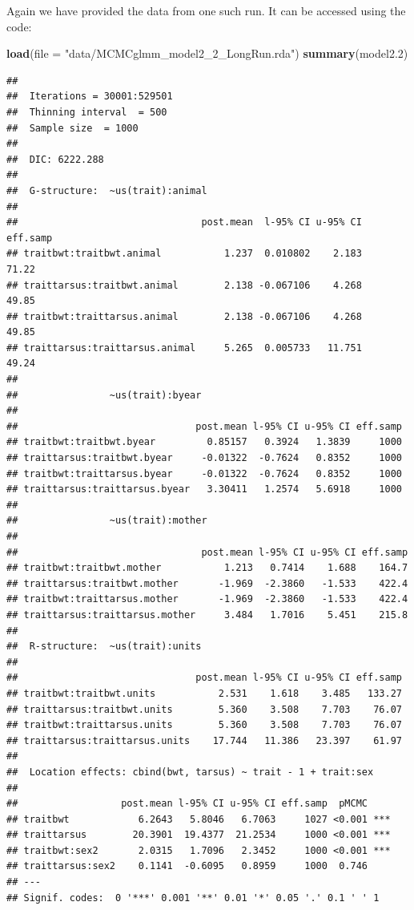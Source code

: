\documentclass[
  12pt,
]{book}
\newenvironment{Shaded}{\begin{snugshade}}{\end{snugshade}}
\newcommand{\DataTypeTok}[1]{\textcolor[rgb]{0.13,0.29,0.53}{#1}}
\newcommand{\FloatTok}[1]{\textcolor[rgb]{0.00,0.00,0.81}{#1}}
\newcommand{\KeywordTok}[1]{\textcolor[rgb]{0.13,0.29,0.53}{\textbf{#1}}}
\newcommand{\NormalTok}[1]{#1}
\newcommand{\StringTok}[1]{\textcolor[rgb]{0.31,0.60,0.02}{#1}}
\begin{document}
Again we have provided the data from one such run. It can be accessed using the code:

\begin{Shaded}
\begin{Highlighting}[]
\KeywordTok{load}\NormalTok{(}\DataTypeTok{file =} \StringTok{"data/MCMCglmm\_model2\_2\_LongRun.rda"}\NormalTok{)}
\KeywordTok{summary}\NormalTok{(model2}\FloatTok{.2}\NormalTok{)}
\end{Highlighting}
\end{Shaded}

\begin{verbatim}
## 
##  Iterations = 30001:529501
##  Thinning interval  = 500
##  Sample size  = 1000 
## 
##  DIC: 6222.288 
## 
##  G-structure:  ~us(trait):animal
## 
##                                post.mean  l-95% CI u-95% CI eff.samp
## traitbwt:traitbwt.animal           1.237  0.010802    2.183    71.22
## traittarsus:traitbwt.animal        2.138 -0.067106    4.268    49.85
## traitbwt:traittarsus.animal        2.138 -0.067106    4.268    49.85
## traittarsus:traittarsus.animal     5.265  0.005733   11.751    49.24
## 
##                ~us(trait):byear
## 
##                               post.mean l-95% CI u-95% CI eff.samp
## traitbwt:traitbwt.byear         0.85157   0.3924   1.3839     1000
## traittarsus:traitbwt.byear     -0.01322  -0.7624   0.8352     1000
## traitbwt:traittarsus.byear     -0.01322  -0.7624   0.8352     1000
## traittarsus:traittarsus.byear   3.30411   1.2574   5.6918     1000
## 
##                ~us(trait):mother
## 
##                                post.mean l-95% CI u-95% CI eff.samp
## traitbwt:traitbwt.mother           1.213   0.7414    1.688    164.7
## traittarsus:traitbwt.mother       -1.969  -2.3860   -1.533    422.4
## traitbwt:traittarsus.mother       -1.969  -2.3860   -1.533    422.4
## traittarsus:traittarsus.mother     3.484   1.7016    5.451    215.8
## 
##  R-structure:  ~us(trait):units
## 
##                               post.mean l-95% CI u-95% CI eff.samp
## traitbwt:traitbwt.units           2.531    1.618    3.485   133.27
## traittarsus:traitbwt.units        5.360    3.508    7.703    76.07
## traitbwt:traittarsus.units        5.360    3.508    7.703    76.07
## traittarsus:traittarsus.units    17.744   11.386   23.397    61.97
## 
##  Location effects: cbind(bwt, tarsus) ~ trait - 1 + trait:sex 
## 
##                  post.mean l-95% CI u-95% CI eff.samp  pMCMC    
## traitbwt            6.2643   5.8046   6.7063     1027 <0.001 ***
## traittarsus        20.3901  19.4377  21.2534     1000 <0.001 ***
## traitbwt:sex2       2.0315   1.7096   2.3452     1000 <0.001 ***
## traittarsus:sex2    0.1141  -0.6095   0.8959     1000  0.746    
## ---
## Signif. codes:  0 '***' 0.001 '**' 0.01 '*' 0.05 '.' 0.1 ' ' 1
\end{verbatim}
\end{document}
